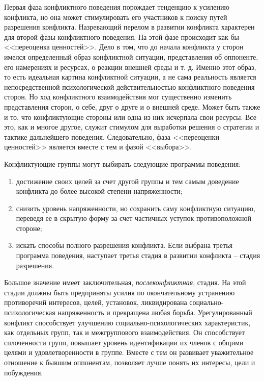 Первая фаза конфликтного поведения порождает тенденцию к усилению конфликта, но
она может стимулировать его участников к поиску путей разрешения конфликта.
Назревающий перелом в развитии конфликта характерен для второй фазы
конфликтного поведения. На этой фазе происходит как бы <<переоценка
ценностей>>. Дело в том, что до начала конфликта у сторон имелся определенный
образ конфликтной ситуации, представления об оппоненте, его намерениях и
ресурсах, о реакции внешней среды и т. д. Именно этот образ, то есть идеальная
картина конфликтной ситуации, а не сама реальность является непосредственной
психологической действительностью конфликтного поведения сторон. Но ход
конфликтного взаимодействия мог существенно изменить представления сторон, о
себе, друг о друге и о внешней среде. Может быть также и то, что конфликтующие
стороны или одна из них исчерпала свои ресурсы. Все это, как и многое другое,
служит стимулом для выработки решения о стратегии и тактике дальнейшего
поведения. Следовательно, фаза  <<переоценки ценностей>> является вместе с тем
и фазой <<выбора>>.

Конфликтующие группы могут выбирать следующие программы поведения:
\begin{enumerate}
    \item достижение своих целей за счет другой группы и тем самым доведение
    конфликта до более высокой степени напряженности;
    \item снизить уровень напряженности, но сохранить саму конфликтную
    ситуацию, переведя ее в скрытую форму за счет частичных уступок
    противоположной стороне;
    \item искать способы полного разрешения конфликта. Если выбрана третья
    программа поведения, наступает третья стадия в развитии конфликта -- стадия
    разрешения.
\end{enumerate}

Большое значение имеет заключительная, \emph{послеконфликтная}, стадия. На этой
стадии должны быть предприняты усилия по окончательному устранению противоречий
интересов, целей, установок, ликвидирована социально-\linebreak психологическая
напряженность и прекращена любая борьба. Урегулированный конфликт способствует
улучшению социально-\-психологических характеристик, как отдельных групп, так и
межгруппового взаимодействия. Он способствует сплоченности групп, повышает
уровень идентификации их членов с общими целями и удовлетворенности в группе.
Вместе с тем он развивает уважительное отношение к бывшим оппонентам, позволяет
лучше понять их интересы, цели и побуждения.

